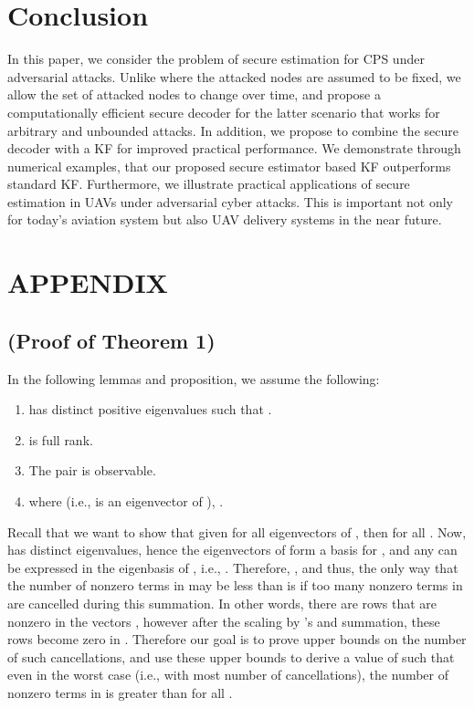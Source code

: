 \documentclass[journal]{IEEEtran}
\begin{document}
\section{Conclusion}
In this paper, we consider the problem of secure estimation for CPS under adversarial attacks. Unlike \cite{Fawzi2014} where the attacked nodes are assumed to be fixed, we allow the set of attacked nodes to change over time, and propose a computationally efficient secure decoder for the latter scenario that works for arbitrary and unbounded attacks. In addition, we propose to combine the secure decoder with a KF for improved practical performance. We demonstrate through numerical examples, that our proposed secure estimator based KF outperforms standard KF. Furthermore, we illustrate practical applications of secure estimation in UAVs under adversarial cyber attacks. This is important not only for today's aviation system but also UAV delivery systems in the near future. 



\section*{APPENDIX}

\subsection*{(Proof of Theorem 1)}
In the following lemmas and proposition, we assume the following:
\begin{enumerate}
\item  has  distinct positive eigenvalues such that .\item  is full rank. 
\item The pair  is observable.
\item  where   (i.e.,  is an eigenvector of ), .
\end{enumerate}

Recall that we want to show that given  for all eigenvectors  of , then  for all . Now,  has  distinct eigenvalues, hence the eigenvectors of  form a basis for , and any  can be expressed in the eigenbasis of , i.e., . Therefore, , and thus, the only way that the number of nonzero terms in  may be less than  is if too many nonzero terms in  are cancelled during this summation. 
In other words, there are rows that are nonzero in the vectors , however after the scaling by 's and summation, these rows become zero in . Therefore our goal is to prove upper bounds on the number of such cancellations, and use these upper bounds to derive a value of  such that even in the worst case (i.e., with most number of cancellations), the number of nonzero terms in  is greater than  for all .
\end{document}
